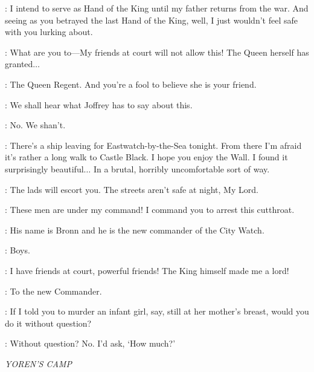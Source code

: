 
\TYRION: I intend to serve as Hand of the King until my father returns from the war. And seeing as you betrayed the last Hand of the King, well, I just wouldn't feel safe with you lurking about.

\JANOSSLYNT: What are you to---My friends at court will not allow this! The Queen herself has granted$\ldots$

\TYRION: The Queen Regent. And you're a fool to believe she is your friend.

\JANOSSLYNT: We shall hear what Joffrey has to say about this.

\TYRION: No. We shan't.


\TYRION: There's a ship leaving for Eastwatch-by-the-Sea tonight. From there I'm afraid it's rather a long walk to Castle Black. I hope you enjoy the Wall. I found it surprisingly beautiful$\ldots$ In a brutal, horribly uncomfortable sort of way.

\BRONN: The lads will escort you. The streets aren't safe at night, My Lord.

\JANOSSLYNT: These men are under my command! I command you to arrest this cutthroat.

\TYRION: His name is Bronn and he is the new commander of the City Watch.

\BRONN: Boys.


\JANOSSLYNT: I have friends at court, powerful friends! The King himself made me a lord!


\TYRION: To the new Commander.


\TYRION: If I told you to murder an infant girl, say, still at her mother's breast, would you do it without question?

\BRONN: Without question? No. I'd ask, `How much?'


\scene

\textit{YOREN'S CAMP}


